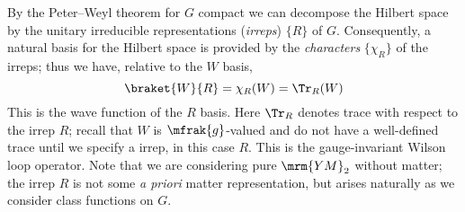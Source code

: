 \documentclass[a4paper
	,10pt
]{article}
\newcommand{\YM}{{\ensuremath{\mrm{YM}_2}}\xspace}
\begin{document}
	By the Peter--Weyl theorem for
$G$ compact we can decompose the Hilbert space by the unitary irreducible
representations (\textit{irreps}) $\{R\}$ of $G$. 
	Consequently, a natural basis for the Hilbert space is provided by the \textit{characters} $\{\chi_R\}$ of the irreps; thus we have, relative to the $W$ basis,
	\begin{equation}
		\braket{W}{R}
		= \chi_R (W)
		= \Tr_R (W)
	\end{equation}
	This is the wave function of the $R$ basis.
	Here $\Tr_R$ denotes trace with respect to the irrep $R$; recall that $W$ is $\mfrak{g}$-valued and do not have a well-defined trace until we specify a irrep, in this case $R$. This is the gauge-invariant Wilson loop operator. Note that we are considering pure \YM without matter; the irrep $R$ is not some \textit{a priori} matter representation, but arises naturally as we consider class functions on $G$. 
\end{document}

